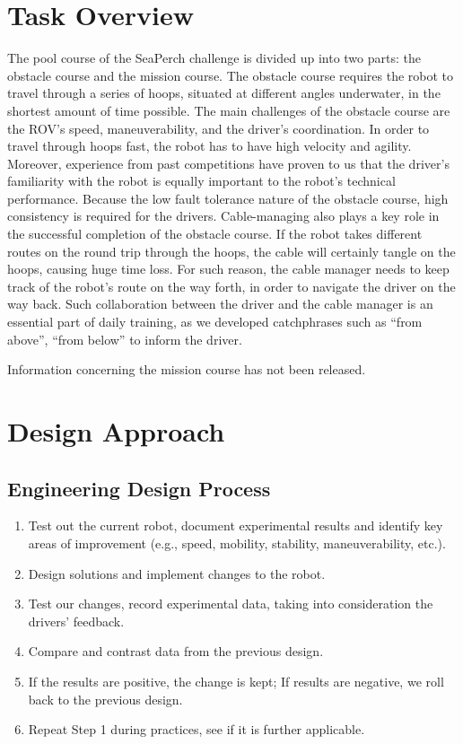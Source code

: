 \documentclass[11pt, oneside]{article}   	%
\begin{document}
\section{Task Overview}
	The pool course of the SeaPerch challenge is divided up into two parts: the obstacle course and the mission course. The obstacle course requires the robot to travel through a series of hoops, situated at different angles underwater, in the shortest amount of time possible. The main challenges of the obstacle course are the ROV’s speed, maneuverability, and the driver’s coordination. In order to travel through hoops fast, the robot has to have high velocity and agility. Moreover, experience from past competitions have proven to us that the driver’s familiarity with the robot is equally important to the robot’s technical performance. Because the low fault tolerance nature of the obstacle course, high consistency is required for the drivers. Cable-managing also plays a key role in the successful completion of the obstacle course. If the robot takes different routes on the round trip through the hoops, the cable will certainly tangle on the hoops, causing huge time loss. For such reason, the cable manager needs to keep track of the robot’s route on the way forth, in order to navigate the driver on the way back. Such collaboration between the driver and the cable manager is an essential part of daily training, as we developed catchphrases such as “from above”, “from below” to inform the driver.

Information concerning the mission course has not been released.

\section{Design Approach}
\subsection{Engineering Design Process}
\begin{enumerate}
	\item Test out the current robot, document experimental results and identify key areas of improvement (e.g., speed, mobility, stability, maneuverability, etc.).
	\item Design solutions and implement changes to the robot.
	\item Test our changes, record experimental data, taking into consideration the drivers’ feedback.
	\item Compare and contrast data from the previous design.
	\item If the results are positive, the change is kept; If results are negative, we roll back to the previous design.
	\item Repeat Step 1 during practices, see if it is further applicable.
\end{enumerate}
\end{document}
